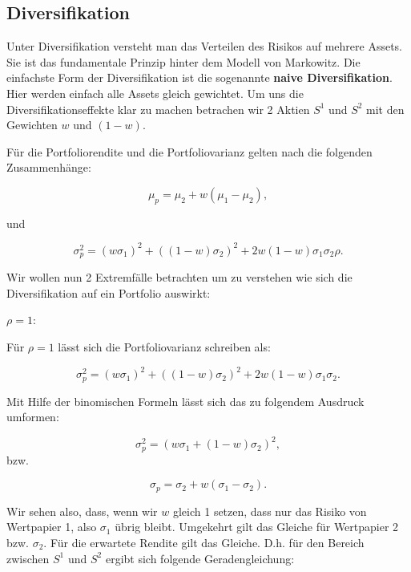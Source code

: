 \documentclass[parskip=half]{scrartcl}
\begin{document}
	
	\subsection{Diversifikation}
	Unter Diversifikation versteht man das Verteilen des Risikos auf mehrere Assets. Sie ist das fundamentale Prinzip hinter dem Modell von Markowitz. Die einfachste Form der Diversifikation ist die sogenannte \textbf{naive Diversifikation}. Hier werden einfach alle Assets gleich gewichtet. 
	Um uns die Diversifikationseffekte klar zu machen betrachen wir 2 Aktien $S^1$ und $S^2$ mit den Gewichten $w$ und $(1-w)$.
	
	Für die Portfoliorendite und die Portfoliovarianz gelten nach \textcite[22]{Kremer} die folgenden Zusammenhänge:
	
	\begin{equation}
		\mu_p = \mu_2 + w(\mu_1 - \mu_2) ,
	\end{equation}
	
	und
	
	\begin{equation}
		\sigma_p^2 = (w \sigma_1)^2 + ((1 - w) \sigma_2)^2 + 2w(1 - w)\sigma_1 \sigma_2 \rho .
	\end{equation}
	
	Wir wollen nun 2 Extremfälle betrachten um zu verstehen wie sich die Diversifikation auf ein Portfolio auswirkt:
	
	\textbf{$\rho = 1$}:
	
	Für $\rho = 1$ lässt sich die Portfoliovarianz schreiben als:
	
	\begin{equation*}
		\sigma_p^2 = (w \sigma_1)^2 + ((1 - w) \sigma_2)^2 + 2w(1 - w)\sigma_1 \sigma_2 .
	\end{equation*}
	
	Mit Hilfe der binomischen Formeln lässt sich das zu folgendem Ausdruck umformen:
	
	\begin{equation*}
		\sigma_p^2 = (w \sigma_1 + (1-w)\sigma_2)^2 ,
	\end{equation*}
	bzw.
	
	\begin{equation*}
		\sigma_p = \sigma_2 + w(\sigma_1 - \sigma_2) .
	\end{equation*}
	
	Wir sehen also, dass, wenn wir $w$ gleich 1 setzen, dass nur das Risiko von Wertpapier 1, also $\sigma_1$ übrig bleibt. Umgekehrt gilt das Gleiche für Wertpapier 2 bzw. $\sigma_2$. Für die erwartete Rendite gilt das Gleiche. D.h. für den Bereich zwischen $S^1$ und $S^2$ ergibt sich folgende Geradengleichung:
	
\end{document}
